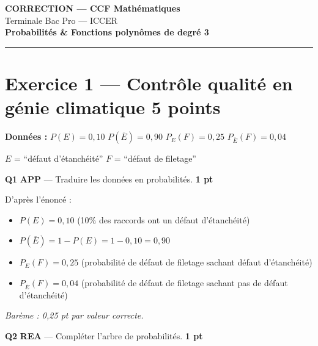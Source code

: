 \documentclass[a4paper,11pt]{article}
\newcommand{\pts}[1]{\hfill\textcolor{gris}{\small\textbf{#1}}}
\newcommand{\comp}[1]{\colorbox{blue!10}{\scriptsize\textbf{#1}}}
\begin{document}
\begin{center}
{\LARGE\bfseries\color{rouge} CORRECTION — CCF Mathématiques}\\[8pt]
{\large Terminale Bac Pro — ICCER}\\[8pt]
{\Large\bfseries Probabilités \& Fonctions polynômes de degré 3}\\[12pt]
\textcolor{rouge}{\rule{12cm}{1pt}}
\end{center}

\vspace{10pt}

\section*{Exercice 1 — Contrôle qualité en génie climatique \pts{5 points}}

\begin{contextebox}
\textbf{Données :} $P(E) = 0{,}10$ \quad $P(\overline{E}) = 0{,}90$ \quad $P_E(F) = 0{,}25$ \quad $P_{\overline{E}}(F) = 0{,}04$

\smallskip
$E$ = ``défaut d'étanchéité'' \quad $F$ = ``défaut de filetage''
\end{contextebox}

\vspace{6pt}

\textbf{Q1} \comp{APP} — Traduire les données en probabilités. \pts{1 pt}

\begin{corrbox}
D'après l'énoncé :
\begin{itemize}[nosep]
  \item $P(E) = 0{,}10$ \quad (10\% des raccords ont un défaut d'étanchéité)
  \item $P(\overline{E}) = 1 - P(E) = 1 - 0{,}10 = \boxed{0{,}90}$
  \item $P_E(F) = 0{,}25$ \quad (probabilité de défaut de filetage sachant défaut d'étanchéité)
  \item $P_{\overline{E}}(F) = 0{,}04$ \quad (probabilité de défaut de filetage sachant pas de défaut d'étanchéité)
\end{itemize}

\textit{Barème : 0,25 pt par valeur correcte.}
\end{corrbox}

\textbf{Q2} \comp{REA} — Compléter l'arbre de probabilités. \pts{1 pt}
\end{document}
